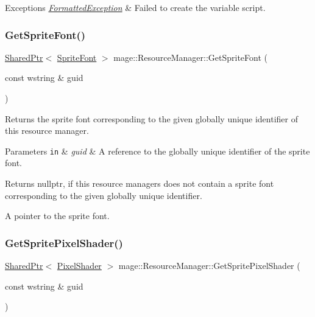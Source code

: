 \begin{DoxyExceptions}{Exceptions}
{\em \hyperlink{structmage_1_1_formatted_exception}{Formatted\+Exception}} & Failed to create the variable script. \\
\hline
\end{DoxyExceptions}
\hypertarget{classmage_1_1_resource_manager_a6ad7dc799e076da85d4638380b1838ff}{}\label{classmage_1_1_resource_manager_a6ad7dc799e076da85d4638380b1838ff} 
\subsubsection{\texorpdfstring{Get\+Sprite\+Font()}{GetSpriteFont()}}
{\footnotesize\ttfamily \hyperlink{namespacemage_a1e01ae66713838a7a67d30e44c67703e}{Shared\+Ptr}$<$ \hyperlink{classmage_1_1_sprite_font}{Sprite\+Font} $>$ mage\+::\+Resource\+Manager\+::\+Get\+Sprite\+Font (\begin{DoxyParamCaption}\item[{const wstring \&}]{guid }\end{DoxyParamCaption})\hspace{0.3cm}{\ttfamily [noexcept]}}

Returns the sprite font corresponding to the given globally unique identifier of this resource manager.


\begin{DoxyParams}[1]{Parameters}
\mbox{\tt in}  & {\em guid} & A reference to the globally unique identifier of the sprite font. \\
\hline
\end{DoxyParams}
\begin{DoxyReturn}{Returns}
{\ttfamily nullptr}, if this resource managers does not contain a sprite font corresponding to the given globally unique identifier. 

A pointer to the sprite font. 
\end{DoxyReturn}
\hypertarget{classmage_1_1_resource_manager_a792f554641a11f5782ffccb5b3f0364c}{}\label{classmage_1_1_resource_manager_a792f554641a11f5782ffccb5b3f0364c} 
\subsubsection{\texorpdfstring{Get\+Sprite\+Pixel\+Shader()}{GetSpritePixelShader()}}
{\footnotesize\ttfamily \hyperlink{namespacemage_a1e01ae66713838a7a67d30e44c67703e}{Shared\+Ptr}$<$ \hyperlink{classmage_1_1_pixel_shader}{Pixel\+Shader} $>$ mage\+::\+Resource\+Manager\+::\+Get\+Sprite\+Pixel\+Shader (\begin{DoxyParamCaption}\item[{const wstring \&}]{guid }\end{DoxyParamCaption})\hspace{0.3cm}{\ttfamily [noexcept]}}

